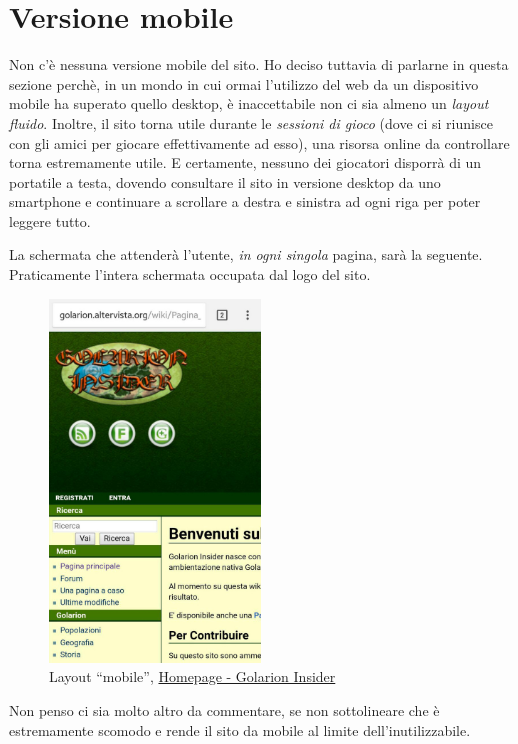 \section{Versione mobile}

Non c'è nessuna versione mobile del sito. Ho deciso tuttavia di parlarne in questa sezione
perchè, in un mondo in cui ormai l'utilizzo del web da un dispositivo mobile ha superato
quello desktop, è inaccettabile non ci sia almeno un \emph{layout fluido}.
Inoltre, il sito torna utile durante le \emph{sessioni di gioco} (dove ci si riunisce con
gli amici per giocare effettivamente ad esso), una risorsa online da controllare
torna estremamente utile. E certamente, nessuno dei giocatori disporrà di un portatile a testa,
dovendo consultare il sito in versione desktop da uno smartphone e continuare a scrollare a destra e sinistra
ad ogni riga per poter leggere tutto.

La schermata che attenderà l'utente, \emph{in ogni singola} pagina, sarà la seguente. Praticamente l'intera schermata occupata dal
logo del sito.

\begin{figure}[hbt]
    \centering
    \includegraphics[width=0.5\textwidth]{img/mobile.jpg}
    \caption{Layout ``mobile'', \href{http://golarion.altervista.org/wiki/Pagina_principale}{Homepage - Golarion Insider}}
\end{figure} 

Non penso ci sia molto altro da commentare, se non sottolineare che è estremamente scomodo e rende il sito 
da mobile al limite dell'inutilizzabile.
